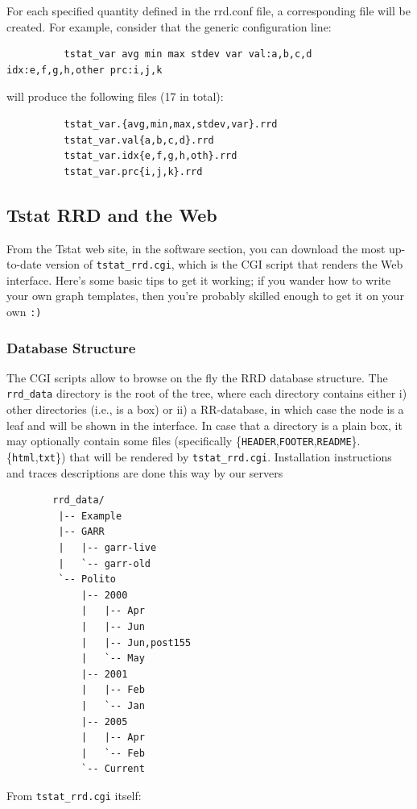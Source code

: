 \documentclass[11pt]{article}
\begin{document}
For each specified quantity defined in the rrd.conf file, a corresponding file
will be created.
For example, consider that the generic configuration line:

\begin{small}\begin{verbatim}
          tstat_var avg min max stdev var val:a,b,c,d idx:e,f,g,h,other prc:i,j,k
\end{verbatim}\end{small} \noindent
will produce the following files (17 in total):

\begin{small}\begin{verbatim}
          tstat_var.{avg,min,max,stdev,var}.rrd
          tstat_var.val{a,b,c,d}.rrd
          tstat_var.idx{e,f,g,h,oth}.rrd
          tstat_var.prc{i,j,k}.rrd
\end{verbatim}\end{small} \noindent
\subsection{Tstat RRD and the Web\label{Tstat_RRD_and_the_Web}}


From the Tstat web site, in the software section, you can
download the most up-to-date version of \texttt{tstat\_rrd.cgi},
which is the CGI script that renders the Web interface.
Here's some basic tips to get it working; if you wander
how to write your own graph templates, then you're probably
skilled enough to get it on your own \texttt{:)}

\subsubsection{Database Structure\label{Database_Structure}}


The CGI scripts allow to browse on the fly the RRD database structure.
The \texttt{rrd\_data} directory is the root of the tree, where each
directory contains either i) other directories (i.e., is a box) 
or ii) a RR-database, in which case the node is a leaf and will be 
shown in the interface. In case that a directory is a plain box, it may
optionally contain some files (specifically 
\{\texttt{HEADER},\texttt{FOOTER},\texttt{README}\}.\{\texttt{html},\texttt{txt}\})
that will be rendered by \texttt{tstat\_rrd.cgi}. Installation 
instructions and traces descriptions are done this way by our servers

\begin{small}\begin{verbatim}
        rrd_data/
         |-- Example
         |-- GARR
         |   |-- garr-live
         |   `-- garr-old
         `-- Polito
             |-- 2000
             |   |-- Apr
             |   |-- Jun
             |   |-- Jun,post155
             |   `-- May
             |-- 2001
             |   |-- Feb
             |   `-- Jan
             |-- 2005
             |   |-- Apr
             |   `-- Feb
             `-- Current
\end{verbatim}\end{small} \noindent
From \texttt{tstat\_rrd.cgi} itself:
\end{document}
